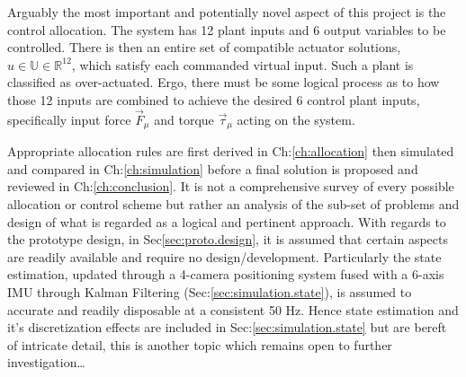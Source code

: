 \par
Arguably the most important and potentially novel aspect of this project is the control allocation. The system has 12 plant inputs and 6 output variables to be controlled. There is then an entire set of compatible actuator solutions, $u\in\mathbb{U}\in\mathbb{R}^{12}$, which satisfy each commanded virtual input. Such a plant is classified as over-actuated. Ergo, there must be some logical process as to how those 12 inputs are combined to achieve the desired 6 control plant inputs, specifically input force $\vec{F}_{\mu}$ and torque $\vec{\tau}_{\mu}$ acting on the system.
\par
Appropriate allocation rules are first derived in Ch:\ref{ch:allocation} then simulated and compared in Ch:\ref{ch:simulation} before a final solution is proposed and reviewed in Ch:\ref{ch:conclusion}. It is not a comprehensive survey of every possible allocation or control scheme but rather an analysis of the sub-set of problems and design of what is regarded as a logical and pertinent approach. With regards to the prototype design,\; in Sec\ref{sec:proto.design}, it is assumed that certain aspects are readily available and require no design/development. Particularly the state estimation, updated through a 4-camera positioning system fused with a 6-axis IMU through Kalman Filtering (Sec:\ref{sec:simulation.state}), is assumed to accurate and readily disposable at a consistent 50 Hz. Hence state estimation and it's discretization effects are included in Sec:\ref{sec:simulation.state} but are bereft of intricate detail, this is another topic which remains open to further investigation\ldots
